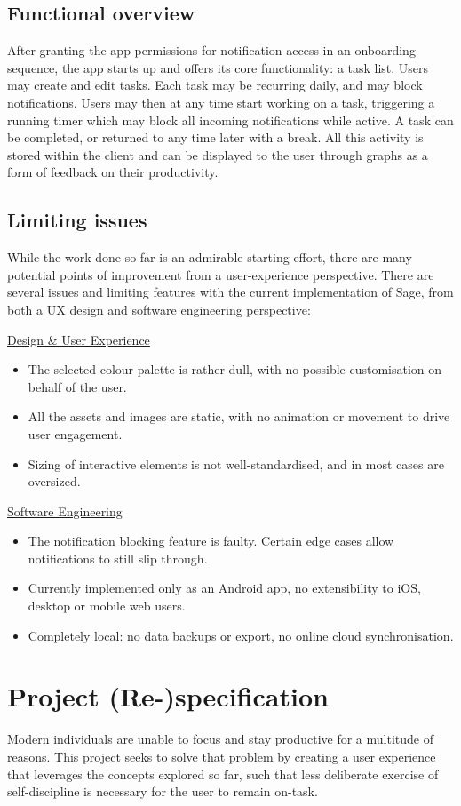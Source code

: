 \subsection{Functional overview}
After granting the app permissions for notification access in an onboarding sequence, the app starts up and offers its core functionality: a task list. Users may create and edit tasks. Each task may be recurring daily, and may block notifications. Users may then at any time start working on a task, triggering a running timer which may block all incoming notifications while active. A task can be completed, or returned to any time later with a break. All this activity is stored within the client and can be displayed to the user through graphs as a form of feedback on their productivity.


\subsection{Limiting issues}
While the work done so far is an admirable starting effort, there are many potential points of improvement from a user-experience perspective. There are several issues and limiting features with the current implementation of Sage, from both a UX design and software engineering perspective:

\underline{Design \& User Experience}
\begin{itemize}
    \item The selected colour palette is rather dull, with no possible customisation on behalf of the user.
    \item All the assets and images are static, with no animation or movement to drive user engagement.
    \item Sizing of interactive elements is not well-standardised, and in most cases are oversized.
\end{itemize}

\underline{Software Engineering}
\begin{itemize}
    \item The notification blocking feature is faulty. Certain edge cases allow notifications to still slip through.
    \item Currently implemented only as an Android app, no extensibility to iOS, desktop or mobile web users.
    \item Completely local: no data backups or export, no online cloud synchronisation.
\end{itemize}


\section{Project (Re-)specification}
Modern individuals are unable to focus and stay productive for a multitude of reasons. This project seeks to solve that problem by creating a user experience that leverages the concepts explored so far, such that less deliberate exercise of self-discipline is necessary for the user to remain on-task.


